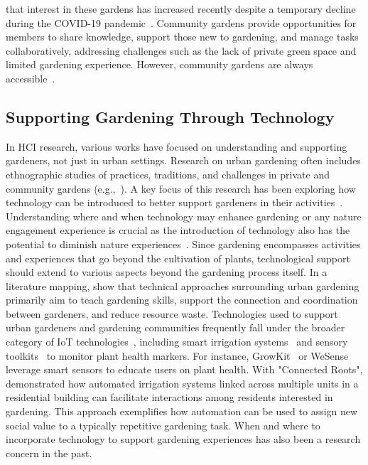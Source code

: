 that interest in these gardens has increased recently despite a temporary decline during the COVID-19 pandemic~\cite{bieri2024a}. Community gardens provide opportunities for members to share knowledge, support those new to gardening, and manage tasks collaboratively, addressing challenges such as the lack of private green space and limited gardening experience. However, community gardens are always accessible~\cite{guitart2012}.

\subsection{Supporting Gardening Through Technology}\label{subsec:tech-garden-rel}
In HCI research, various works have focused on understanding and supporting gardeners, not just in urban settings. Research on urban gardening often includes ethnographic studies of practices, traditions, and challenges in private and community gardens (e.g.,~\cite{community,CommunityGardenParticipatory}). A key focus of this research has been exploring how technology can be introduced to better support gardeners in their activities~\cite{Rodgers2020}. Understanding where and when technology may enhance gardening or any nature engagement experience is crucial as the introduction of technology also has the potential to diminish nature experiences~\cite{jones2018dealing, cumboAdverse2020,bidwell2010}.
Since gardening encompasses activities and experiences that go beyond the cultivation of plants, technological support should extend to various aspects beyond the gardening process itself. 
In a literature mapping,\citet{Rodgers2020} show that technical approaches surrounding urban gardening primarily aim to teach gardening skills, support the connection and coordination between gardeners, and reduce resource waste. Technologies used to support urban gardeners and gardening communities frequently fall under the broader category of IoT technologies~\cite{Rodgers2020}, including smart irrigation systems~\cite{pearceSmartWatering, smartWatering1, smartWatering2} and sensory toolkits~\cite{growkit, wesenseEdu} to monitor plant health markers. For instance, GrowKit~\cite{growkit} or WeSense~\cite{wesenseEdu} leverage smart sensors to educate users on plant health.  With "Connected Roots", \citet{smartWatering2} demonstrated how automated irrigation systems linked across multiple units in a residential building can facilitate interactions among residents interested in gardening. This approach exemplifies how automation can be used to assign new social value to a typically repetitive gardening task. When and where to incorporate technology to support gardening experiences has also been a research concern in the past. 
